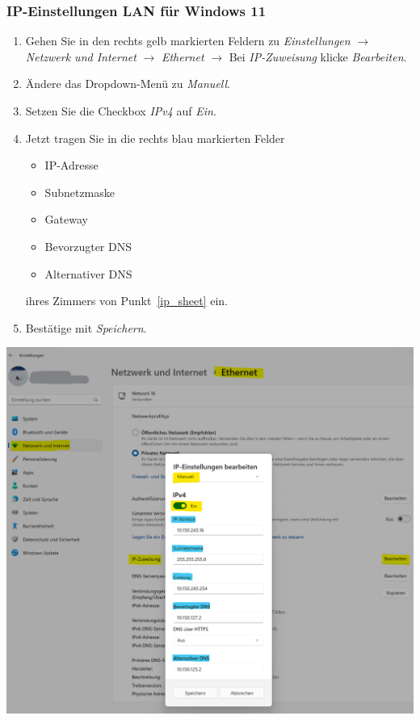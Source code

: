 \documentclass[a4paper,12pt]{scrartcl}
\begin{document}
\subsubsection*{IP-Einstellungen LAN für Windows 11}
\begin{minipage}{0.57\textwidth}
\begin{enumerate}
	\item Gehen Sie in den rechts gelb markierten Feldern zu \textit{Einstellungen} $\rightarrow$ \textit{Netzwerk und Internet} $\rightarrow$ \textit{Ethernet} $\rightarrow$ Bei \textit{IP-Zuweisung} klicke \textit{Bearbeiten}.
	\item Ändere das Dropdown-Menü zu \textit{Manuell}.
	\item Setzen Sie die Checkbox \textit{IPv4} auf \textit{Ein}.
	\item Jetzt tragen Sie in die rechts blau markierten Felder
		\begin{itemize}
			\item IP-Adresse
			\item Subnetzmaske
			\item Gateway
			\item Bevorzugter DNS
			\item Alternativer DNS
		\end{itemize}
	ihres Zimmers von Punkt~\ref{ip_sheet} ein.
	\item Bestätige mit \textit{Speichern}.
\end{enumerate}
\end{minipage}
\hfill
\begin{minipage}{0.4\textwidth}
\includegraphics[width=\linewidth]{Bilder/Win11/ip_win11_de}
\end{minipage}
\end{document}
